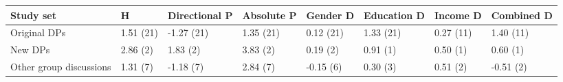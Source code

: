 
\begin{tabular}{llllllll}
\toprule
Study set & H & Directional P & Absolute P & Gender D & Education D & Income D & Combined D\\
\midrule
Original DPs & 1.51 (21) & -1.27 (21) & 1.35 (21) & 0.12 (21) & 1.33 (21) & 0.27 (11) & 1.40 (11)\\
New DPs & 2.86 (2) & 1.83 (2) & 3.83 (2) & 0.19 (2) & 0.91 (1) & 0.50 (1) & 0.60 (1)\\
Other group discussions & 1.31 (7) & -1.18 (7) & 2.84 (7) & -0.15 (6) & 0.30 (3) & 0.51 (2) & -0.51 (2)\\
\bottomrule
\end{tabular}
